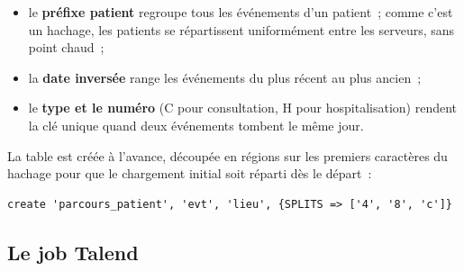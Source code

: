 \begin{itemize}
	\item le \textbf{préfixe patient} regroupe tous les événements d'un patient~; comme c'est un hachage, les patients se répartissent uniformément entre les serveurs, sans point chaud~;
	\item la \textbf{date inversée} range les événements du plus récent au plus ancien~;
	\item le \textbf{type et le numéro} (C pour consultation, H pour hospitalisation) rendent la clé unique quand deux événements tombent le même jour.
\end{itemize}

\noindent La table est créée à l'avance, découpée en régions sur les premiers caractères du hachage pour que le chargement initial soit réparti dès le départ~:

\begin{center}
\begin{minipage}{0.92\textwidth}
\begin{tcolorbox}[colback=title2!6,colframe=title1,boxsep=2pt]
\begin{verbatim}
create 'parcours_patient', 'evt', 'lieu', {SPLITS => ['4', '8', 'c']}
\end{verbatim}
\end{tcolorbox}
\end{minipage}
\end{center}

\subsection{Le job Talend}

\begin{center}
\end{center}

